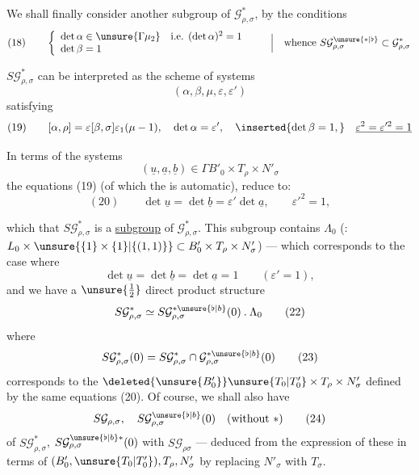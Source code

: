 We shall finally consider another subgroup  of
$\mathcal G_{\rho,\sigma}^{*}$, by the conditions
\[
(18)\qquad
\left\{\begin{array}{l}
\det\alpha\in\unsure{\Gamma\mu_2}\quad\text{i.e. }(\det\alpha)^2=1\\
\det\beta=1
\end{array}\right.
\qquad\left|\quad\text{whence }S\mathcal G_{\rho,\sigma}^{\unsure{*|\flat}}
\subset\mathcal G_{\rho,\sigma}^{*}\right.
\]

 
$S\mathcal G_{\rho,\sigma}^{*}$ can be interpreted as the scheme of systems
\[
(\alpha,\beta,\mu,\varepsilon,\varepsilon')
\]
satisfying
\[
(19)\qquad [\alpha,\rho]=\varepsilon[\beta,\sigma]\varepsilon_1(\mu-1),
\quad\det\alpha=\varepsilon',\quad
\inserted{\det\beta=1,}\quad
\underline{\varepsilon^2=\varepsilon'^2=1}
\]

In terms of the systems
\[
(\underline u,\underline a,\underline b)\in\Gamma B'_0\times T_\rho\times N'_\sigma
\]
the equations (19) (of which the  is automatic), reduce to:
\[
(20)\qquad\det\underline u=\det\underline b=\varepsilon'\det\underline a,
\qquad\varepsilon'^2=1,
\]



which  that $S\mathcal{G}_{\rho,\sigma}^{*}$ is  a \uline{subgroup}
of $\mathcal{G}_{\rho,\sigma}^{*}$. This subgroup contains $\Lambda_0$
(: $L_0\times\unsure{\{1\}\times\{1\}|\{(1,1)\}}\subset B'_0\times T_\rho\times N'_\sigma$) --- which
corresponds to the case where 
\[
\det\underline{u}=\det\underline{b}=\det\underline{a}=1\qquad(\varepsilon'=1),
\tag{21}
\]
and we have a $\unsure{\frac12}$ direct product structure
\[
S\mathcal{G}_{\rho,\sigma}^{*}\simeq S\mathcal{G}_{\rho,\sigma}^{*\unsure{\flat|b}}(0)\mathbin{.}\Lambda_0
\tag{22}
\]
where
\[
S\mathcal{G}_{\rho,\sigma}^{*}(0)=S\mathcal{G}_{\rho,\sigma}^{*}\cap\mathcal{G}_{\rho,\sigma}^{*\unsure{\flat|b}}(0)
\tag{23}
\]
corresponds to the   $\deleted{\unsure{B'_0}}\unsure{T_0|T'_0}\times T_\rho\times N'_\sigma$
 defined by the same equations
(20). Of course, we shall also have
\[
S\mathcal{G}_{\rho,\sigma},\quad S\mathcal{G}_{\rho,\sigma}^{\unsure{\flat|b}}(0)\quad(\text{without }*)
\tag{24}
\]
  of $S\mathcal{G}_{\rho,\sigma}^{*}$, $S\mathcal{G}_{\rho,\sigma}^{\unsure{\flat|b}*}(0)$ with
$S\mathcal{G}_{\rho\sigma}$ --- deduced from the expression
of these in terms of $(B'_0,\unsure{T_0|T'_0}),T_\rho,N'_\sigma$
by replacing $N'_\sigma$ with $T_\sigma$.

